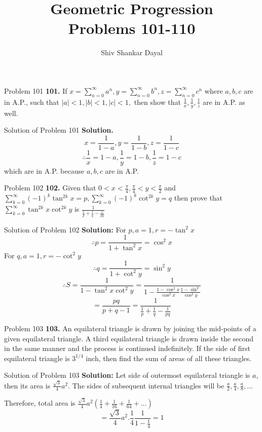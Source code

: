 \documentclass[aspectratio=1610,8pt]{beamer}
\title{Geometric Progression\\Problems 101-110}
\author[Shiv Shankar Dayal]{Shiv Shankar Dayal}
\begin{document}
\begin{frame}
  \titlepage
\end{frame}
\begin{frame}{Problem 101}
  \textbf{101.} If $x = \sum_{n=0}^\infty a^n, y = \sum_{n=0}^\infty b^n, z = \sum_{n=0}^\infty c^n$ where $a, b, c$ are in A.P.,
  such that $|a| < 1, |b|< 1, |c| < 1,$ then show that $\frac{1}{x}, \frac{1}{y}, \frac{1}{z}$ are in A.P. as well.
\end{frame}
\begin{frame}{Solution of Problem 101}
  \textbf{Solution.} $$x = \frac{1}{1 - a}, y = \frac{1}{1 - b}, z = \frac{1}{1 - c}$$
  $$\therefore \frac{1}{x} = 1 -a, \frac{1}{y} = 1 - b, \frac{1}{z} = 1 - c$$ which are in A.P. because $a, b, c$ are in A.P.
\end{frame}
\begin{frame}{Problem 102}
  \textbf{102.} Given that $0 < x< \frac{\pi}{4}, \frac{\pi}{4} < y <\frac{\pi}{2}$ and $\sum_{k=0}^\infty(-1)^k\tan^{2k}x = p,
  \sum_{k=0}^\infty(-1)^k\cot^{2k}y = q$ then prove that $\sum_{k = 0}^\infty \tan^{2k}x\cot^{2k}y$ is $\frac{1}{\frac{1}{p} +
    \frac{1}{q} - \frac{1}{pq}}$
\end{frame}
\begin{frame}{Solution of Problem 102}
  \textbf{Solution:} For $p, a= 1, r= -\tan^2x$
  $$\therefore p = \frac{1}{1 +\tan^2x} = \cos^2x$$
  For $q, a = 1, r = -\cot^2y$
  $$\therefore q = \frac{1}{1 + \cot^2y} = \sin^2y$$
  $$\therefore S = \frac{1}{1 -\tan^2x\cot^2y} = \frac{1}{1 - \frac{1 - \cos^2x}{\cos^2x}\frac{1 - \sin^y}{\cos^2y}}$$
  $$= \frac{pq}{p + q - 1} = \frac{1}{\frac{1}{p} + \frac{1}{q} - \frac{1}{pq}}$$
\end{frame}
\begin{frame}{Problem 103}
  \textbf{103.} An equilateral triangle is drawn by joining the mid-points of a given equilateral triangle. A third equilateral
  triangle is drawn inside the second in the same manner and the process is continued indefinitely. If the side of first
  equilateral triangle is $3^{1/4}$ inch, then find the sum of areas of all these triangles.
\end{frame}
\begin{frame}{Solution of Problem 103}
  \textbf{Solution:} Let side of outermost equilateral triangle is $a$, then its area is $\frac{\sqrt{3}}{4}a^2$. The sides of
  subsequent internal triangles will be $\frac{a}{2}, \frac{a}{4}, \frac{a}{8}, ...$

  Therefore, total area is $\frac{\sqrt{3}}{4}a^2\left(\frac{1}{4} + \frac{1}{16} + \frac{1}{64} + ... \right)$
  $$=\frac{\sqrt{3}}{4}a^2.\frac{1}{4}\frac{1}{1 - \frac{1}{4}} = 1$$
\end{frame}
\end{document}
